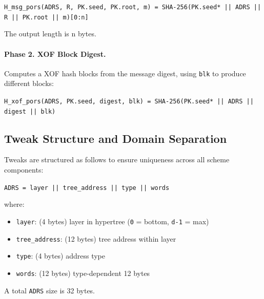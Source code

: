 \begin{center}
    \texttt{H\_msg\_pors(ADRS, R, PK.seed, PK.root, m) = SHA-256(PK.seed* || ADRS || R || PK.root || m)[0:n]}
\end{center}
The output length is n bytes.

\paragraph{Phase 2. XOF Block Digest.} Computes a XOF hash blocks from the message digest, using \texttt{blk} to produce different blocks:

\begin{center}
    \texttt{H\_xof\_pors(ADRS, PK.seed, digest, blk) = SHA-256(PK.seed* || ADRS || digest || blk)}
\end{center}

\subsection{Tweak Structure and Domain Separation}
Tweaks are structured as follows to ensure uniqueness across all scheme components:

\begin{center}
\texttt{ADRS = layer || tree\_address || type || words}
\end{center}
where: 
\begin{itemize}
    \item[] \texttt{layer}: (4 bytes) layer in hypertree (\texttt{0} = bottom, \texttt{d-1} = max)
    \item[] \texttt{tree\_address}: (12 bytes) tree address within layer
    \item[] \texttt{type}: (4 bytes) address type
    \item[] \texttt{words}: (12 bytes) type-dependent 12 bytes
\end{itemize}
A total \texttt{ADRS} size is 32 bytes.

